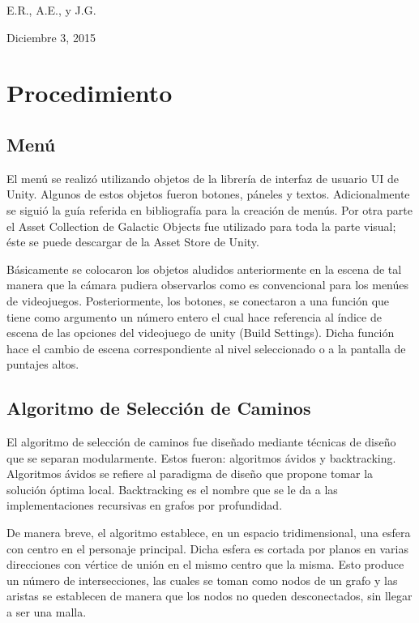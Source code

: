 \documentclass[12pt, conference]{IEEEtran}
\begin{document}
\hfill E.R., A.E., y J.G.
 
\hfill Diciembre 3, 2015

\section{Procedimiento}

\subsection{Men\'{u}}

El men\'{u} se realiz\'{o} utilizando objetos de la librer\'{i}a de interfaz de usuario UI de Unity. Algunos de estos objetos fueron botones, p\'{a}neles y textos. Adicionalmente se sigui\'{o} la gu\'{i}a referida en bibliograf\'{i}a para la creaci\'{o}n de men\'{u}s. Por otra parte el Asset Collection de Galactic Objects fue utilizado para toda la parte visual; \'{e}ste se puede descargar de la Asset Store de Unity.

B\'{a}sicamente se colocaron los objetos aludidos anteriormente en la escena de tal manera que la c\'{a}mara pudiera observarlos como es convencional para los men\'{u}es de videojuegos. Posteriormente, los botones, se conectaron a una funci\'{o}n que tiene como argumento un n\'{u}mero entero el cual hace referencia al \'{i}ndice de escena de las opciones del videojuego de unity (Build Settings). Dicha funci\'{o}n hace el cambio de escena correspondiente al nivel seleccionado o a la pantalla de puntajes altos.

\subsection{Algoritmo de Selecci\'{o}n de Caminos}

El algoritmo de selecci\'{o}n de caminos fue dise\~{n}ado mediante t\'{e}cnicas de dise\~{n}o que se separan modularmente. Estos fueron: algoritmos \'{a}vidos y backtracking. Algoritmos \'{a}vidos se refiere al paradigma de dise\~{n}o que propone tomar la soluci\'{o}n \'{o}ptima local. Backtracking es el nombre que se le da a las implementaciones recursivas en grafos por profundidad.

De manera breve, el algoritmo establece, en un espacio tridimensional, una esfera con centro en el personaje principal. Dicha esfera es cortada por planos en varias direcciones con v\'{e}rtice de uni\'{o}n en el mismo centro que la misma. Esto produce un n\'{u}mero de intersecciones, las cuales se toman como nodos de un grafo y las aristas se establecen de manera que los nodos no queden desconectados, sin llegar a ser una malla.
\end{document}
